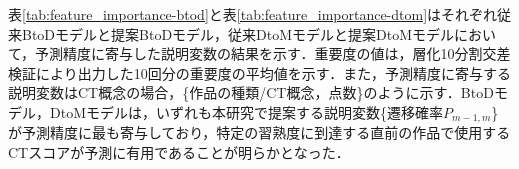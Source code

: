 \documentclass[submit]{ipsj}
\begin{document}



表\ref{tab:feature_importance-btod}と表\ref{tab:feature_importance-dtom}はそれぞれ従来BtoDモデルと提案BtoDモデル，従来DtoMモデルと提案DtoMモデルにおいて，予測精度に寄与した説明変数の結果を示す．重要度の値は，層化10分割交差検証により出力した10回分の重要度の平均値を示す．また，予測精度に寄与する説明変数はCT概念の場合，\{作品の種類/CT概念，点数\}のように示す．BtoDモデル，DtoMモデルは，いずれも本研究で提案する説明変数\{遷移確率$P_{m-1,m}$\}が予測精度に最も寄与しており，特定の習熟度に到達する直前の作品で使用するCTスコアが予測に有用であることが明らかとなった．




\end{document}
